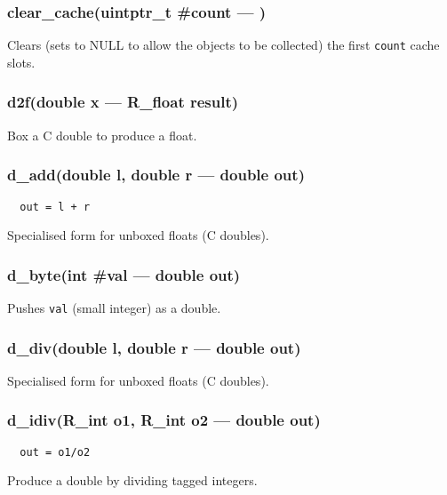 \subsubsection{clear\_cache(uintptr\_t \#count --- )}
\vspace{-1em}Clears (sets to NULL to allow the objects to be collected) the first \texttt{count} cache slots. \vspace{-1em}
\subsubsection{d2f(double x --- R\_float result)}
\vspace{-1em}Box a C double to produce a float. \vspace{-1em}
\subsubsection{d\_add(double l, double r --- double out)}
\vspace{-1em}\begin{verbatim}
  out = l + r
\end{verbatim}
\vspace{-1em}Specialised form for unboxed floats (C doubles). \vspace{-1em}
\subsubsection{d\_byte(int \#val --- double out)}
\vspace{-1em}Pushes \texttt{val} (small integer) as a double. \vspace{-1em}
\subsubsection{d\_div(double l, double r --- double out)}
\vspace{-1em}Specialised form for unboxed floats (C doubles). \vspace{-1em}
\subsubsection{d\_idiv(R\_int o1, R\_int o2 --- double out)}
\vspace{-1em}\begin{verbatim}
  out = o1/o2
\end{verbatim}
\vspace{-1em}Produce a double by dividing tagged integers. \vspace{-1em}
